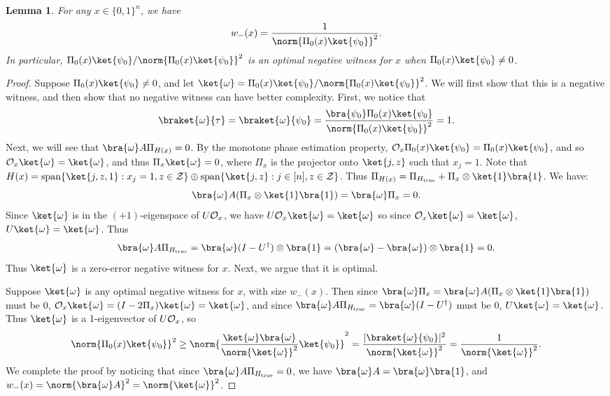 \documentclass[11pt]{article}
\numberwithin{equation}{section}
\newtheorem{lemma}[theorem]{Lemma}
\theoremstyle{definition}
\theoremstyle{plain}
\begin{document}
\begin{lemma}\label{lem:monotone-alg-neg}
For any $x\in \{0,1\}^n$, we have
$$w_-(x) = \frac{1}{\norm{\Pi_0(x)\ket{\psi_0}}^2}.$$
In particular, $\Pi_0(x)\ket{\psi_0}/\norm{\Pi_0(x)\ket{\psi_0}}^2$ is an optimal negative witness for $x$ when \mbox{$\Pi_0(x)\ket{\psi_0}\neq 0$.} 
\end{lemma}
\begin{proof}
Suppose $\Pi_0(x)\ket{\psi_0}\neq 0$, and let $\ket{\omega}=\Pi_0(x)\ket{\psi_0}/\norm{\Pi_0(x)\ket{\psi_0}}^2$. We will first show that this is a negative witness, and then show that no negative witness can have better complexity. First, we notice that
$$\braket{\omega}{\tau}=\braket{\omega}{\psi_0}=\frac{\bra{\psi_0}\Pi_0(x)\ket{\psi_0}}{\norm{\Pi_0(x)\ket{\psi_0}}^2}=1.$$
Next, we will see that $\bra{\omega}A\Pi_{H(x)}=0$. By the monotone phase estimation property, ${\cal O}_x\Pi_0(x)\ket{\psi_0}=\Pi_0(x)\ket{\psi_0}$, and so ${\cal O}_x\ket{\omega}=\ket{\omega}$, and thus $\Pi_x\ket{\omega}=0$, where $\Pi_x$ is the projector onto $\ket{j,z}$ such that $x_j=1$. Note that $H(x)=\mathrm{span}\{\ket{j,z,1}:x_j=1,z\in{\cal Z}\}\oplus\mathrm{span}\{\ket{j,z}:j\in[n],z\in{\cal Z}\}$. Thus $\Pi_{H(x)}=\Pi_{H_\mathrm{true}}+\Pi_x\otimes\ket{1}\bra{1}$. We have:
$$\bra{\omega}A(\Pi_x\otimes\ket{1}\bra{1}) = \bra{\omega}\Pi_x = 0.$$
Since $\ket{\omega}$ is in the $(+1)$-eigenspace of $U{\cal O}_x$, we have $U{\cal O}_x\ket{\omega}=\ket{\omega}$ so since ${\cal O}_x\ket{\omega}=\ket{\omega}$, $U\ket{\omega}=\ket{\omega}$. Thus
$$\bra{\omega}A\Pi_{H_\mathrm{true}}=\bra{\omega}(I-U^\dagger)\otimes\bra{1}=(\bra{\omega}-\bra{\omega})\otimes \bra{1}=0.$$
Thus $\ket{\omega}$ is a zero-error negative witness for $x$. Next, we argue that it is optimal. 

Suppose $\ket{\omega}$ is any optimal negative witness for $x$, with size $w_-(x)$. Then since $\bra{\omega} \Pi_x=\bra{\omega} A(\Pi_x\otimes\ket{1}\bra{1})$ must be 0, ${\cal O}_x\ket{\omega}=(I-2\Pi_x)\ket{\omega}=\ket{\omega}$, and since $\bra{\omega} A \Pi_{H_{\mathrm{true}}}=\bra{\omega} (I-U^\dagger)$ must be 0, $U\ket{\omega}=\ket{\omega}$. Thus $\ket{\omega}$ is a 1-eigenvector of $U{\cal O}_x$, so 
$$\norm{\Pi_0(x)\ket{\psi_0}}^2\geq \norm{\frac{\ket{\omega}\bra{\omega}}{\norm{\ket{\omega}}^2}\ket{\psi_0}}^2
= \frac{|\braket{\omega}{\psi_0}|^2}{\norm{\ket{\omega}}^2} = \frac{1}{\norm{\ket{\omega}}^2}.$$
We complete the proof by noticing that since $\bra{\omega} A\Pi_{H_{\mathrm{true}}}=0$, we have $\bra{\omega} A = \bra{\omega}\bra{1}$, and $w_-(x)=\norm{\bra{\omega} A}^2 = \norm{\ket{\omega}}^2$.
\end{proof}
\end{document}
